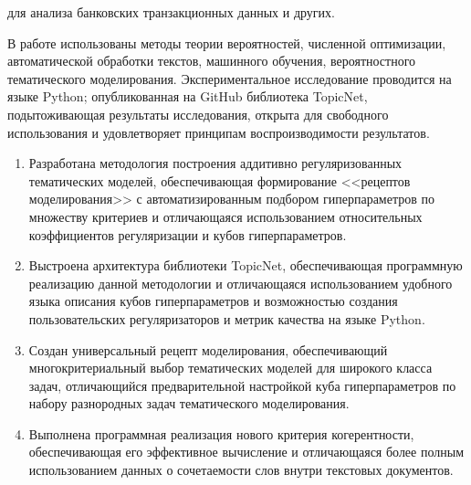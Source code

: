 для анализа банковских транзакционных данных \cite{egorov2019topic} и других.

{\methods} В работе использованы методы теории вероятностей, численной оптимизации, автоматической обработки текстов, машинного обучения, вероятностного тематического моделирования. Экспериментальное исследование проводится на языке Python; опубликованная на GitHub библиотека TopicNet, подытоживающая результаты исследования, открыта для свободного использования и удовлетворяет принципам воспроизводимости результатов.

{}

\begin{enumerate}[beginpenalty=10000] %

\item

    Разработана методология построения аддитивно регуляризованных тематических моделей, обеспечивающая формирование <<рецептов моделирования>> с автоматизированным подбором гиперпараметров по множеству критериев и отличающаяся использованием относительных коэффициентов регуляризации и кубов гиперпараметров.

\item

    Выстроена архитектура библиотеки TopicNet, обеспечивающая программную реализацию данной методологии и отличающаяся использованием удобного языка описания кубов гиперпараметров и возможностью создания пользовательских регуляризаторов и метрик качества на языке Python.

\item

    Создан универсальный рецепт моделирования, обеспечивающий многокритериальный выбор тематических моделей для широкого класса задач, отличающийся предварительной настройкой куба гиперпараметров по набору разнородных задач тематического моделирования.

\item

    Выполнена программная реализация нового критерия когерентности, обеспечивающая его эффективное вычисление и отличающаяся более полным использованием данных о сочетаемости слов внутри текстовых документов.



\end{enumerate}

